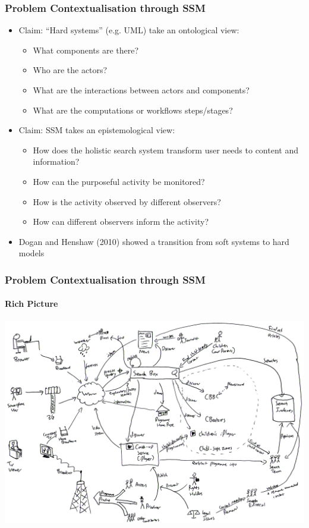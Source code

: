 \documentclass{beamer}
\begin{document}
\begin{frame}
  \frametitle{Problem Contextualisation through SSM}
  \begin{itemize}
    \pause \item Claim: ``Hard systems'' (e.g. UML) take an ontological view:
    \begin{itemize}
      \item What components are there?
      \item Who are the actors?
      \item What are the interactions between actors and components?
      \item What are the computations or workflows steps/stages?
    \end{itemize}
    \pause \item Claim: SSM takes an epistemological view:
    \begin{itemize}
      \item How does the holistic search system transform user needs to content and information?
      \item How can the purposeful activity be monitored?
      \item How is the activity observed by different observers?
      \item How can different observers inform the activity?
    \end{itemize}
    \pause \item Dogan and Henshaw (2010) showed a transition from soft systems to hard models
  \end{itemize}
\end{frame}

\begin{frame} 
  \frametitle{Problem Contextualisation through SSM}
  \framesubtitle{Rich Picture}
  \pause \includegraphics[width=\linewidth]{rich-picture.png}
\end{frame}
\end{document}
